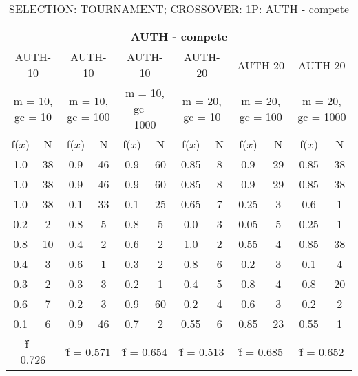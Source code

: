 \begin{table}[H]
	\centering
	\caption{SELECTION: TOURNAMENT; CROSSOVER: 1P: AUTH - compete}
	\begin{adjustbox}{width=1\textwidth}
		\begin{tabular}{ |c|c||c|c||c|c||c|c||c|c||c|c| }
			\hline
			\multicolumn{12}{|c|}{AUTH - compete} \\
			\hline
			\multicolumn{2}{|c||}{AUTH-10} & \multicolumn{2}{c||}{AUTH-10} & \multicolumn{2}{c||}{AUTH-10} & \multicolumn{2}{c||}{AUTH-20} & \multicolumn{2}{c||}{AUTH-20} & \multicolumn{2}{c|}{AUTH-20}\\
			\hline
			\multicolumn{2}{|c||}{m = 10, gc = 10} & \multicolumn{2}{c||}{m = 10, gc = 100} & \multicolumn{2}{c||}{m = 10, gc = 1000} & \multicolumn{2}{c||}{m = 20, gc = 10} & \multicolumn{2}{c||}{m = 20, gc = 100} & \multicolumn{2}{c|}{m = 20, gc = 1000}\\
			\hline
			f($\bar{x}$) & N & f($\bar{x}$) & N & f($\bar{x}$) & N & f($\bar{x}$) & N & f($\bar{x}$) & N & f($\bar{x}$) & N\\
			\hline
			\hline
			1.0 & 38 & 0.9 & 46 & 0.9 & 60 & 0.85 & 8 & 0.9 & 29 & 0.85 & 38\\
			\hline
			1.0 & 38 & 0.9 & 46 & 0.9 & 60 & 0.85 & 8 & 0.9 & 29 & 0.85 & 38\\
			1.0 & 38 & 0.1 & 33 & 0.1 & 25 & 0.65 & 7 & 0.25 & 3 & 0.6 & 1\\
			0.2 & 2 & 0.8 & 5 & 0.8 & 5 & 0.0 & 3 & 0.05 & 5 & 0.25 & 1\\
			0.8 & 10 & 0.4 & 2 & 0.6 & 2 & 1.0 & 2 & 0.55 & 4 & 0.85 & 38\\
			0.4 & 3 & 0.6 & 1 & 0.3 & 2 & 0.8 & 6 & 0.2 & 3 & 0.1 & 4\\
			0.3 & 2 & 0.3 & 3 & 0.2 & 1 & 0.4 & 5 & 0.8 & 4 & 0.8 & 20\\
			0.6 & 7 & 0.2 & 3 & 0.9 & 60 & 0.2 & 4 & 0.6 & 3 & 0.2 & 2\\
			0.1 & 6 & 0.9 & 46 & 0.7 & 2 & 0.55 & 6 & 0.85 & 23 & 0.55 & 1\\
			\hline
			\multicolumn{2}{|c||}{\^{f} = 0.726} & \multicolumn{2}{c||}{\^{f} = 0.571} & \multicolumn{2}{c||}{\^{f} = 0.654} & \multicolumn{2}{c||}{\^{f} = 0.513} & \multicolumn{2}{c||}{\^{f} = 0.685} & \multicolumn{2}{c|}{\^{f} = 0.652}\\
			\hline
		\end{tabular}
	\end{adjustbox}
\end{table}

